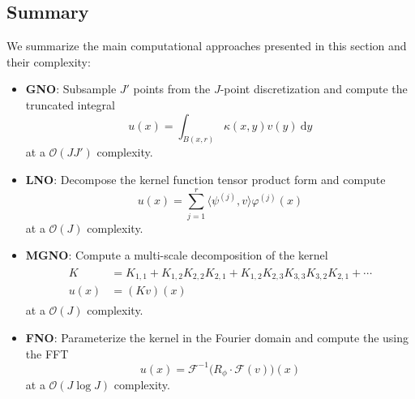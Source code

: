 \documentclass[twoside,11pt]{article}
\newcommand{\cG}{\mathcal{F}}
\begin{document}
\subsection{Summary}
We summarize the main computational approaches presented in this section and their complexity:
\begin{itemize}

\item \textbf{GNO}:    Subsample $J'$ points from the $J$-point discretization and compute the truncated integral
\begin{equation}
u(x)=   
\int_{B(x,r)} \kappa (x,y) v(y) \: \text{d}y 
\end{equation}
at a \(\mathcal{O}(J J')\) complexity.

\item \textbf{LNO}:   Decompose the kernel function tensor product form and compute
\begin{equation}
u(x) =   \sum_{j=1}^r \langle \psi^{(j)}, v \rangle \varphi^{(j)}(x)
\end{equation}
at a \(\mathcal{O}(J)\) complexity.

\item \textbf{MGNO}: Compute a multi-scale decomposition of the kernel 
\begin{align}
\begin{split}
K &= K_{1,1} + K_{1,2}K_{2,2}K_{2,1} + K_{1,2}K_{2,3}K_{3,3}K_{3,2}K_{2,1} + \cdots \\
u(x) &= (Kv)(x)
\end{split}
\end{align}
at a \(\mathcal{O}(J)\) complexity.

\item \textbf{FNO}: Parameterize the kernel in the Fourier domain and compute the using the FFT 
\begin{equation}
u(x) = \cG^{-1} \bigl( R_\phi \cdot \cG(v) \bigr )(x)
\end{equation}
at a \(\mathcal{O}(J \log J)\) complexity.
\end{itemize}

%
%

%


%
%


\end{document}
